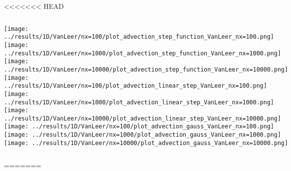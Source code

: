 <<<<<<< HEAD
\begin{frame}
	\vspace{10pt}
	\begin{columns}
			\centering
			\texttt{[image: ../results/1D/VanLeer/nx=100/plot\_advection\_step\_function\_VanLeer\_nx=100.png]}\\
			\texttt{[image: ../results/1D/VanLeer/nx=1000/plot\_advection\_step\_function\_VanLeer\_nx=1000.png]}\\
			\texttt{[image: ../results/1D/VanLeer/nx=10000/plot\_advection\_step\_function\_VanLeer\_nx=10000.png]}
			\centering
			\texttt{[image: ../results/1D/VanLeer/nx=100/plot\_advection\_linear\_step\_VanLeer\_nx=100.png]}\\
			\texttt{[image: ../results/1D/VanLeer/nx=1000/plot\_advection\_linear\_step\_VanLeer\_nx=1000.png]}\\
			\texttt{[image: ../results/1D/VanLeer/nx=10000/plot\_advection\_linear\_step\_VanLeer\_nx=10000.png]}
			\centering
			\texttt{[image: ../results/1D/VanLeer/nx=100/plot\_advection\_gauss\_VanLeer\_nx=100.png]}\\
			\texttt{[image: ../results/1D/VanLeer/nx=1000/plot\_advection\_gauss\_VanLeer\_nx=1000.png]}\\
			\texttt{[image: ../results/1D/VanLeer/nx=10000/plot\_advection\_gauss\_VanLeer\_nx=10000.png]}
	\end{columns}
\end{frame}
=======
